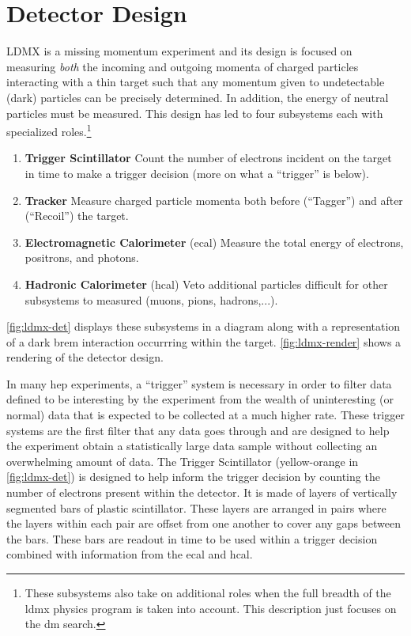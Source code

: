 \section{Detector Design}
LDMX is a missing momentum experiment and its design is focused on measuring \emph{both} the
incoming and outgoing momenta of charged particles interacting with a thin target such that
any momentum given to undetectable (dark) particles can be precisely determined.
In addition, the energy of neutral particles must be measured.
This design has led to four subsystems each with specialized roles.\footnote{
	These subsystems also take on additional roles when the full breadth of the
	\ac{ldmx} physics program is taken into account.
	This description just focuses on the \ac{dm} search.}

\begin{enumerate}
	\item \textbf{Trigger Scintillator} Count the number of electrons incident on the target in time to make a trigger decision (more on what a ``trigger'' is below).
	\item \textbf{Tracker} Measure charged particle momenta both before (``Tagger'') and after (``Recoil'') the target.
	\item \textbf{Electromagnetic Calorimeter} (\ac{ecal}) Measure the total energy of electrons, positrons, and photons.
	\item \textbf{Hadronic Calorimeter} (\acs{hcal}) Veto additional particles difficult for other subsystems to measured (muons, pions, hadrons,...).
\end{enumerate}
\cref{fig:ldmx-det} displays these subsystems in a diagram along with a representation of
a dark brem interaction occurrring within the target. \cref{fig:ldmx-render} shows a rendering
of the detector design.

In many \ac{hep} experiments, a ``trigger'' system is necessary in order to filter data defined to
be interesting by the experiment from the wealth of uninteresting (or normal) data that is expected
to be collected at a much higher rate. These trigger systems are the first filter that any data goes
through and are designed to help the experiment obtain a statistically large data sample without
collecting an overwhelming amount of data.
The Trigger Scintillator (yellow-orange in \cref{fig:ldmx-det}) is designed to help inform the trigger
decision by counting the number of electrons present within the detector. It is made of layers of vertically
segmented bars of plastic scintillator. These layers are arranged in pairs where the layers within
each pair are offset from one another to cover any gaps between the bars. These bars are readout in
time to be used within a trigger decision combined with information from the \ac{ecal} and \ac{hcal}.

